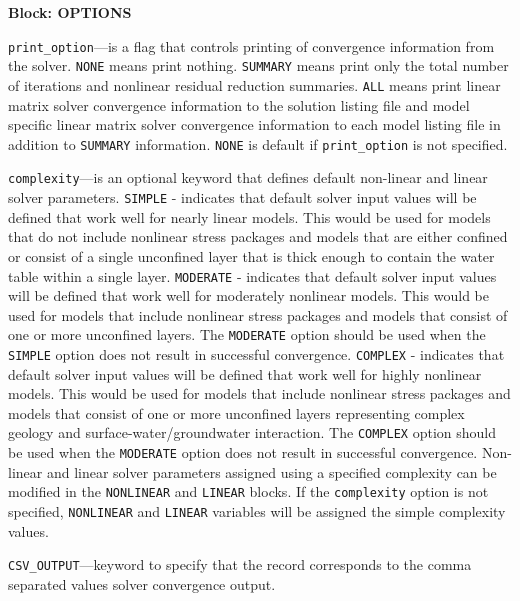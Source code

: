 
\item \textbf{Block: OPTIONS}

\begin{description}
\item \texttt{print\_option}---is a flag that controls printing of convergence information from the solver.  \texttt{NONE} means print nothing. \texttt{SUMMARY} means print only the total number of iterations and nonlinear residual reduction summaries. \texttt{ALL} means print linear matrix solver convergence information to the solution listing file and model specific linear matrix solver convergence information to each model listing file in addition to \texttt{SUMMARY} information. \texttt{NONE} is default if \texttt{print\_option} is not specified.

\item \texttt{complexity}---is an optional keyword that defines default non-linear and linear solver parameters.  \texttt{SIMPLE} - indicates that default solver input values will be defined that work well for nearly linear models. This would be used for models that do not include nonlinear stress packages and models that are either confined or consist of a single unconfined layer that is thick enough to contain the water table within a single layer. \texttt{MODERATE} - indicates that default solver input values will be defined that work well for moderately nonlinear models. This would be used for models that include nonlinear stress packages and models that consist of one or more unconfined layers. The \texttt{MODERATE} option should be used when the \texttt{SIMPLE} option does not result in successful convergence.  \texttt{COMPLEX} - indicates that default solver input values will be defined that work well for highly nonlinear models. This would be used for models that include nonlinear stress packages and models that consist of one or more unconfined layers representing complex geology and surface-water/groundwater interaction. The \texttt{COMPLEX} option should be used when the \texttt{MODERATE} option does not result in successful convergence.  Non-linear and linear solver parameters assigned using a specified complexity can be modified in the \texttt{NONLINEAR} and \texttt{LINEAR} blocks. If the \texttt{complexity} option is not specified, \texttt{NONLINEAR} and \texttt{LINEAR} variables will be assigned the simple complexity values.

\item \texttt{CSV\_OUTPUT}---keyword to specify that the record corresponds to the comma separated values solver convergence output.


\end{description}
